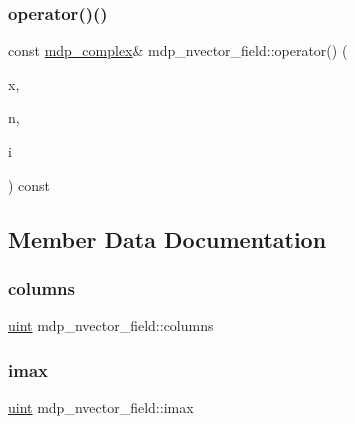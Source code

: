 \mbox{\label{classmdp__nvector__field_a28b319a43b65b20c694fc356ed6c6d88}} 
\subsubsection{\texorpdfstring{operator()()}{operator()()}\hspace{0.1cm}{\footnotesize\ttfamily [3/3]}}
{\footnotesize\ttfamily const \hyperlink{classmdp__complex}{mdp\+\_\+complex}\& mdp\+\_\+nvector\+\_\+field\+::operator() (\begin{DoxyParamCaption}\item[{\hyperlink{classmdp__site}{mdp\+\_\+site}}]{x,  }\item[{int}]{n,  }\item[{int}]{i }\end{DoxyParamCaption}) const\hspace{0.3cm}{\ttfamily [inline]}}



\subsection{Member Data Documentation}
\mbox{\label{classmdp__nvector__field_a796e400fc808b5271faa95abb27ded15}} 
\subsubsection{\texorpdfstring{columns}{columns}}
{\footnotesize\ttfamily \hyperlink{mdp__global__vars_8h_a91ad9478d81a7aaf2593e8d9c3d06a14}{uint} mdp\+\_\+nvector\+\_\+field\+::columns}

\mbox{\label{classmdp__nvector__field_a7c183e06584fdf73fedf889ef1186cdd}} 
\subsubsection{\texorpdfstring{imax}{imax}}
{\footnotesize\ttfamily \hyperlink{mdp__global__vars_8h_a91ad9478d81a7aaf2593e8d9c3d06a14}{uint} mdp\+\_\+nvector\+\_\+field\+::imax}

